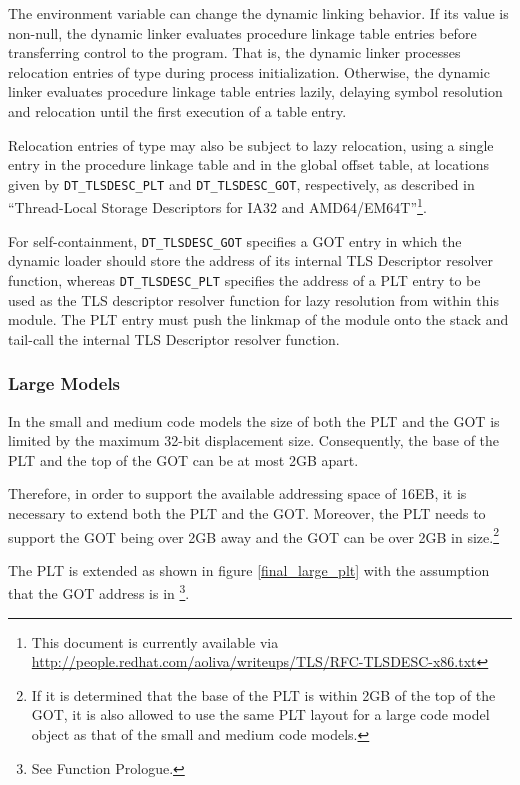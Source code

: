 The  environment variable can change the dynamic
linking behavior.  If its value is non-null, the dynamic linker
evaluates procedure linkage table entries before transferring control
to the program.  That is, the dynamic linker processes relocation
entries of type 
during process initialization.  Otherwise, the dynamic linker
evaluates procedure linkage table entries lazily, delaying symbol
resolution and relocation until the first execution of a table entry.

Relocation entries of type  may also be
subject to lazy relocation, using a single entry in the procedure
linkage table and in the global offset table, at locations given by
\texttt{DT_TLSDESC_PLT} and \texttt{DT_TLSDESC_GOT}, respectively, as
described in ``Thread-Local Storage Descriptors for IA32 and
AMD64/EM64T''\footnote{This document is currently available via
  \url{http://people.redhat.com/aoliva/writeups/TLS/RFC-TLSDESC-x86.txt}}.

For self-containment, \texttt{DT_TLSDESC_GOT} specifies a GOT entry in
which the dynamic loader should store the address of its internal TLS
Descriptor resolver function, whereas \texttt{DT_TLSDESC_PLT}
specifies the address of a PLT entry to be used as the TLS descriptor
resolver function for lazy resolution from within this module.  The
PLT entry must push the linkmap of the module onto the stack and
tail-call the internal TLS Descriptor resolver function.

\subsubsection{Large Models}

In the small and medium code models the size of both the PLT and the GOT
is limited by the maximum 32-bit displacement size.
Consequently, the base of the PLT and the
top of the GOT can be at most 2GB apart.

Therefore, in order to support the available addressing space of 16EB,
it is necessary to extend both the PLT and the GOT. Moreover, the PLT
needs to support the GOT being over 2GB away and the GOT can be over
2GB in size.\footnote{If it is determined that the base of the PLT is
within 2GB of the top of the GOT, it is also allowed to use the same
PLT layout for a large code model object as that of the small and
medium code models.}

The PLT is extended as shown in figure \ref{final_large_plt}
with the assumption that the GOT address is
in \footnote{See Function Prologue.}.

